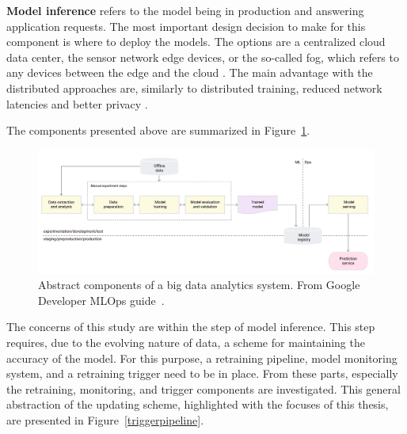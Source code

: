 \textbf{Model inference} refers to the model being in production and answering application requests.
The most important design decision to make for this component is where to deploy the models. The options are a centralized cloud data center, the sensor network edge devices, or the so-called fog, which refers to any devices between the edge and the cloud \cite{fogsurvey}. The main advantage with the distributed approaches are, similarly to distributed training, reduced network latencies and better privacy \cite{szeEfficientProcessingDeep2017}.

The components presented above are summarized in Figure~\ref{simplepipeline}.

\begin{figure}[hb]
\newline
\begin{center}
\includegraphics[width=1.0\columnwidth]{simplegoogle.png}
\caption{Abstract components of a big data analytics system. From Google Developer MLOps guide~\cite{googlemlops}.}
\label{simplepipeline}
\end{center}
\end{figure}

The concerns of this study are within the step of model inference. This step requires, due to the evolving nature of data, a scheme for maintaining the accuracy of the model. For this purpose, a retraining pipeline, model monitoring system, and a retraining trigger need to be in place. From these parts, especially the retraining, monitoring, and trigger components are investigated. This general abstraction of the updating scheme, highlighted with the focuses of this thesis, are presented in Figure~\ref{triggerpipeline}.

